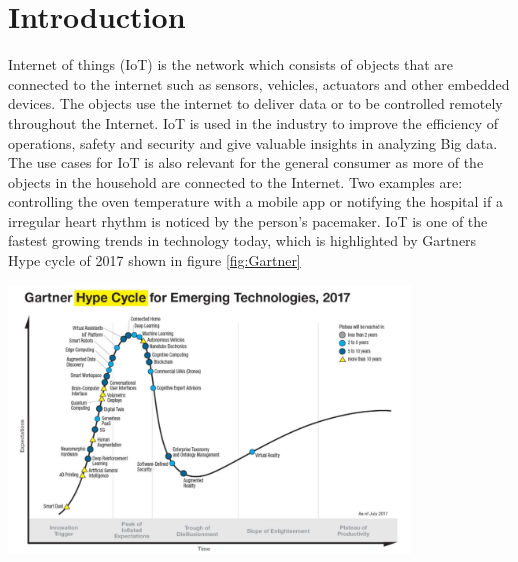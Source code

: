 
\chapter{Introduction}



Internet of things (IoT) is the network which consists of objects that are connected to the internet such as sensors, vehicles, actuators and other embedded devices. The objects use the internet to deliver data or to be controlled remotely throughout the Internet. IoT is used in the industry to improve the efficiency of operations, safety and security and give valuable insights in analyzing Big data. The use cases for IoT is also relevant for the general consumer as more of the objects in the household are connected to the Internet. Two examples are: controlling the oven temperature with a mobile app or notifying the hospital if a irregular heart rhythm is noticed by the person's pacemaker. IoT is one of the fastest growing trends in technology today, which is highlighted by Gartners Hype cycle of 2017 shown in figure \ref{fig:Gartner}\\


\begin{minipage}[t]{0.8\textwidth}
    \centering
    \includegraphics[width=0.8\textwidth]{Images/Gartner.PNG}\\
    \label{fig:Gartner}
\end{minipage}
\\



